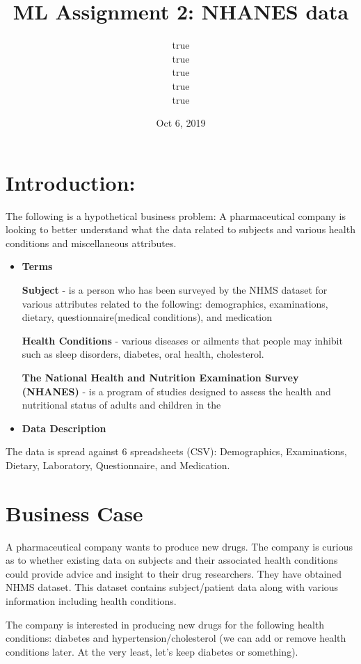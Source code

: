 \documentclass[]{article}
\title{ML Assignment 2: NHANES data}
\author{true \\ true \\ true \\ true \\ true}
\date{Oct 6, 2019}
\begin{document}
\maketitle

\newpage

\hypertarget{introduction}{%
\section{Introduction:}\label{introduction}}

The following is a hypothetical business problem: A pharmaceutical
company is looking to better understand what the data related to
subjects and various health conditions and miscellaneous attributes.

\begin{itemize}
\item
  \textbf{Terms}

  \textbf{Subject} - is a person who has been surveyed by the NHMS
  dataset for various attributes related to the following: demographics,
  examinations, dietary, questionnaire(medical conditions), and
  medication

  \textbf{Health Conditions} - various diseases or ailments that people
  may inhibit such as sleep disorders, diabetes, oral health,
  cholesterol.

  \textbf{The National Health and Nutrition Examination Survey (NHANES)}
  - is a program of studies designed to assess the health and
  nutritional status of adults and children in the
\item
  \textbf{Data Description}
\end{itemize}

The data is spread against 6 spreadsheets (CSV): Demographics,
Examinations, Dietary, Laboratory, Questionnaire, and Medication.

\hypertarget{business-case}{%
\section{Business Case}\label{business-case}}

A pharmaceutical company wants to produce new drugs. The company is
curious as to whether existing data on subjects and their associated
health conditions could provide advice and insight to their drug
researchers. They have obtained NHMS dataset. This dataset contains
subject/patient data along with various information including health
conditions.

The company is interested in producing new drugs for the following
health conditions: diabetes and hypertension/cholesterol (we can add or
remove health conditions later. At the very least, let's keep diabetes
or something).
\end{document}
